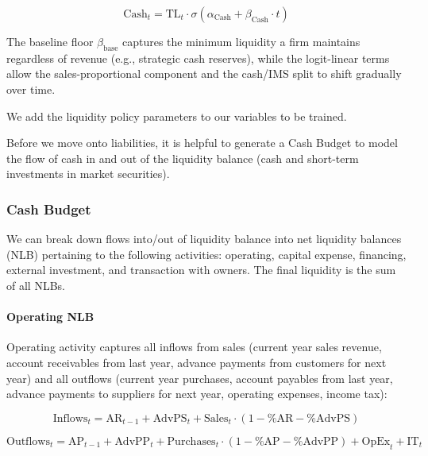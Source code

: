 \documentclass[12pt,a4paper]{article}
\begin{document}
\begin{equation}\label{eq:cash_trend}
\text{Cash}_t = \text{TL}_t \cdot \sigma(\alpha_{\text{Cash}} + \beta_{\text{Cash}} \cdot t)
\end{equation}

The baseline floor $\beta_{\text{base}}$ captures the minimum liquidity
a firm maintains regardless of revenue (e.g., strategic cash reserves),
while the logit-linear terms allow the sales-proportional component and
the cash/IMS split to shift gradually over time.

We add the liquidity policy parameters to our variables to be trained.

Before we move onto liabilities, it is helpful to generate a Cash
Budget to model the flow of cash in and out of the liquidity balance
(cash and short-term investments in market securities).

\subsubsection{Cash Budget}

We can break down flows into/out of liquidity balance into net liquidity
balances (NLB) pertaining to the following activities: operating,
capital expense, financing, external investment, and transaction with
owners. The final liquidity is the sum of all NLBs.

\paragraph{Operating NLB}

Operating activity captures all inflows from sales (current year sales
revenue, account receivables from last year, advance payments from
customers for next year) and all outflows (current year purchases,
account payables from last year, advance payments to suppliers for next
year, operating expenses, income tax):

\begin{equation}\label{eq:operating_inflows}
\text{Inflows}_t = \text{AR}_{t-1} + \text{AdvPS}_t + \text{Sales}_t \cdot (1 - \text{\%AR} - \text{\%AdvPS})
\end{equation}

\begin{equation}\label{eq:operating_outflows}
\text{Outflows}_t = \text{AP}_{t-1} + \text{AdvPP}_t + \text{Purchases}_t \cdot (1 - \text{\%AP} - \text{\%AdvPP}) + \text{OpEx}_t + \text{IT}_t
\end{equation}
\end{document}
